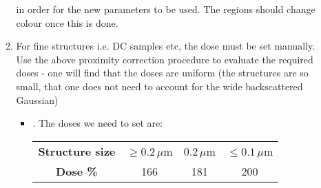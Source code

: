 \begin{itemize}
\begin{enumerate}
 		 in order for the new parameters to be used. The regions should change colour once this is done.
 		\item For fine structures i.e. DC samples etc, the dose must be set manually. Use the above proximity correction procedure to evaluate the required doses - one will find that the doses are uniform (the structures are so small, that one does not need to account for the wide backscattered Gaussian)
 		\begin{itemize}
 			\item {}. The doses we need to set are:
 			
 			\begin{center}
 				\begin{tabular}{|c|c|c|c|}
 					\textbf{Structure size} & $ \ge 0.2\,\mu $m & $ 0.2\,\mu $m & $ \le 0.1\,\mu $m\\
 					\textbf{Dose \%} & 166 & 181 & 200
 				\end{tabular}
 			\end{center}
 		\end{itemize}
 	\end{enumerate}
 \end{itemize}
 
